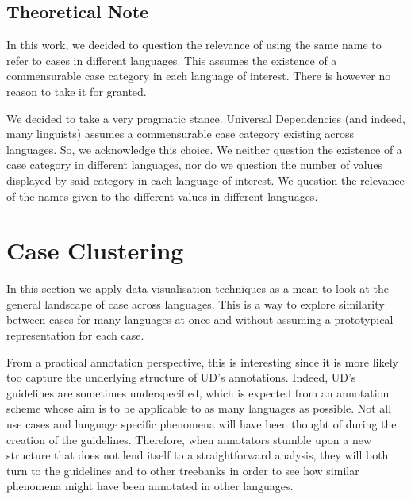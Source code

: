 \documentclass[11pt]{article}
\begin{document}
\subsection{Theoretical Note}
In this work, we decided to question the relevance of using the same name to refer to cases in different languages.
This assumes the existence of a commensurable case category in each language of interest.
There is however no reason to take it for granted.

We decided to take a very pragmatic stance.
Universal Dependencies (and indeed, many linguists) assumes a commensurable case category existing across languages.
So, we acknowledge this choice.
We neither question the existence of a case category in different languages, nor do we question the number of values displayed by said category in each language of interest.
We question the relevance of the names given to the different values in different languages.













\section{Case Clustering}

In this section we apply data visualisation techniques as a mean to look at the general landscape of case across languages.
This is a way to explore similarity between cases for many languages at once and without assuming a prototypical representation for each case.

From a practical annotation perspective, this is interesting since it is more likely too capture the underlying structure of UD's annotations.
Indeed, UD's guidelines are sometimes underspecified, which is expected from an annotation scheme whose aim is to be applicable to as many languages as possible.
Not all use cases and language specific phenomena will have been thought of during the creation of the guidelines.
Therefore, when annotators stumble upon a new structure that does not lend itself to a straightforward analysis, they will both turn to the guidelines and to other treebanks in order to see how similar phenomena might have been annotated in other languages.
\end{document}
